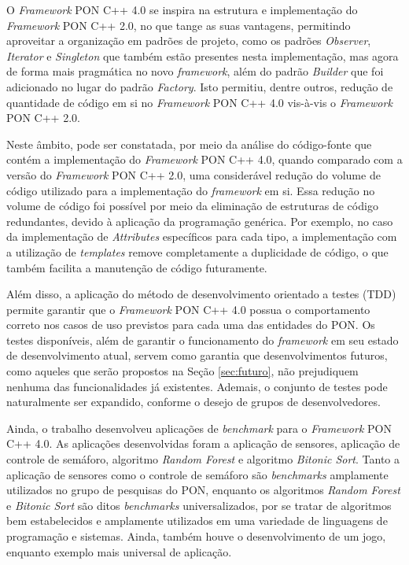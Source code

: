 O \textit{Framework} PON C++ 4.0 se inspira na estrutura e implementação do
\textit{Framework} PON C++ 2.0, no que tange as suas vantagens, permitindo
aproveitar a organização em padrões de projeto, como os padrões
\textit{Observer}, \textit{Iterator} e \textit{Singleton} que também estão
presentes nesta implementação, mas agora de forma mais pragmática no novo
\textit{framework}, além do padrão \textit{Builder} que foi adicionado no lugar
do padrão \textit{Factory}. Isto permitiu, dentre outros, redução de quantidade
de código em si no \textit{Framework} PON C++ 4.0 vis-à-vis o \textit{Framework}
PON C++ 2.0.

Neste âmbito, pode ser constatada, por meio da análise do código-fonte que
contém a implementação do \textit{Framework} PON C++ 4.0, quando comparado com a
versão do \textit{Framework} PON C++ 2.0, uma considerável redução do volume de
código utilizado para a implementação do \textit{framework} em si. Essa redução
no volume de código foi possível por meio da eliminação de estruturas de código
redundantes, devido à aplicação da programação genérica. Por exemplo, no caso da
implementação de \textit{Attributes} específicos para cada tipo, a implementação
com a utilização de \textit{templates} remove completamente a duplicidade de
código, o que também facilita a manutenção de código futuramente.

Além disso, a aplicação do método de desenvolvimento orientado a testes (TDD)
permite garantir que o \textit{Framework} PON C++ 4.0 possua o comportamento
correto nos casos de uso previstos para cada uma das entidades do PON. Os testes
disponíveis, além de garantir o funcionamento do \textit{framework} em seu
estado de desenvolvimento atual, servem como garantia que desenvolvimentos
futuros, como aqueles que serão propostos na Seção \ref{sec:futuro}, não
prejudiquem nenhuma das funcionalidades já existentes.  Ademais, o conjunto de
testes pode naturalmente ser expandido, conforme o desejo de grupos de
desenvolvedores.

Ainda, o trabalho desenvolveu aplicações de \textit{benchmark} para o
\textit{Framework} PON C++ 4.0. As aplicações desenvolvidas foram a aplicação de
sensores, aplicação de controle de semáforo, algoritmo \textit{Random Forest} e
algoritmo \textit{Bitonic Sort}. Tanto a aplicação de sensores como o controle
de semáforo são \textit{benchmarks} amplamente utilizados no grupo de pesquisas
do PON, enquanto os algoritmos \textit{Random Forest} e \textit{Bitonic Sort}
são ditos \textit{benchmarks} universalizados, por se tratar de algoritmos bem
estabelecidos e amplamente utilizados em uma variedade de linguagens de
programação e sistemas. Ainda, também houve o desenvolvimento de um jogo,
enquanto exemplo mais universal de aplicação. 

